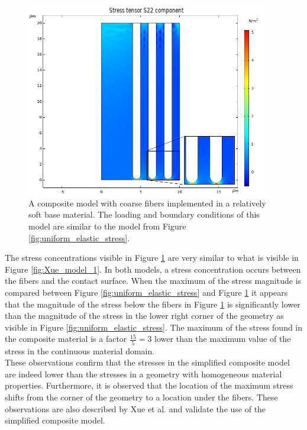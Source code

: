 \begin{figure}[h!]
    \includegraphics[width=0.7\linewidth, height=8.5cm, angle=0]{images/discrete_model_validation/coarse_fibers.png}
    \caption{A composite model with coarse fibers implemented in a relatively soft base material. The loading and boundary conditions of this model are similar to the model from Figure \ref{fig:uniform_elastic_stress}.}
    \label{fig:coarse_fibers}
\end{figure}

\qquad The stress concentrations visible in Figure \ref{fig:coarse_fibers} are very similar to what is visible in Figure \ref{fig:Xue_model_1}. In both models, a stress concentration occurs between the fibers and the contact surface. When the maximum of the stress magnitude is compared between Figure \ref{fig:uniform_elastic_stress} and Figure \ref{fig:coarse_fibers} it appears that the magnitude of the stress below the fibers in Figure \ref{fig:coarse_fibers} is significantly lower than the magnitude of the stress in the lower right corner of the geometry as visible in Figure \ref{fig:uniform_elastic_stress}. The maximum of the stress found in the composite material is a factor $\frac{15}{5} = 3$ lower than the maximum value of the stress in the continuous material domain.\\ 

\qquad These observations confirm that the stresses in the simplified composite model are indeed lower than the stresses in a geometry with homogeneous material properties. Furthermore, it is observed that the location of the maximum stress shifts from the corner of the geometry to a location under the fibers. These observations are also described by Xue et al. and validate the use of the simplified composite model.


